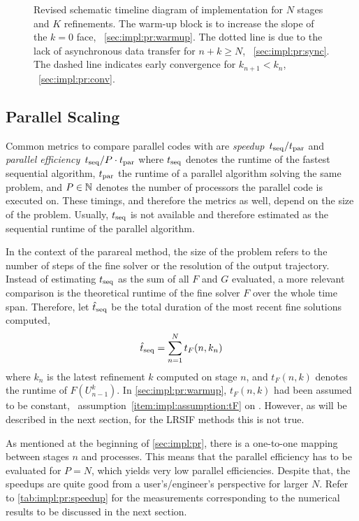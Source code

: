 \begin{figure}[t]
  \centering
  
  \caption[Revised schematic timeline diagram]{%
    Revised schematic timeline diagram of  implementation for $N$ stages and $K$ refinements.
    The warm-up block is to increase the slope of the $k=0$ face,
    \cf~\autoref{sec:impl:pr:warmup}.
    The dotted line is due to the lack of asynchronous data transfer for $n+k \geq N$,
    \cf~\autoref{sec:impl:pr:sync}.
    The dashed line indicates early convergence for $k_{n+1} < k_n$,
    \cf~\autoref{sec:impl:pr:conv}.
  }
  \label{fig:timeline:revised}
\end{figure}

\subsection{Parallel Scaling}

Common metrics to compare parallel codes with are \emph{speedup}~$t_\text{seq}/t_\text{par}$
and \emph{parallel efficiency}~$t_\text{seq}/P\cdot t_\text{par}$
where $t_\text{seq}$ denotes the runtime of the fastest sequential algorithm,
$t_\text{par}$ the runtime of a parallel algorithm solving the same problem,
and $P\in\mathbb{N}$ denotes the number of processors the parallel code is executed on.
These timings, and therefore the metrics as well, depend on the size of the problem.
Usually, $t_\text{seq}$ is not available and therefore estimated as the sequential runtime of the parallel algorithm.

In the context of the parareal method,
the size of the problem refers to the number of steps of the fine solver or the resolution of the output trajectory.
Instead of estimating $t_\text{seq}$ as the sum of all $F$ and $G$ evaluated,
a more relevant comparison is the theoretical runtime of the fine solver $F$ over the whole time span.
Therefore, let $\hat t_\text{seq}$ be the total duration of the most recent fine solutions computed,
\begin{equation}
\label{eq:impl:tseq}
  \hat t_\text{seq} = \sum_{n=1}^N t_F(n, k_n)
\end{equation}
where $k_n$ is the latest refinement $k$ computed on stage $n$,
and $t_F(n,k)$ denotes the runtime of $F(U_{n-1}^k)$.
In \autoref{sec:impl:pr:warmup},
$t_F(n,k)$ had been assumed to be constant,
\cf~assumption~\ref{item:impl:assumption:tF} on .
However, as will be described in the next section,
for the \ac{LRSIF} methods this is not true.

As mentioned at the beginning of \autoref{sec:impl:pr},
there is a one-to-one mapping between stages $n$ and processes.
This means that the parallel efficiency has to be evaluated for $P=N$,
which yields very low parallel efficiencies.
Despite that, the speedups are quite good from a user's/engineer's perspective for larger $N$.
Refer to \autoref{tab:impl:pr:speedup} for the measurements corresponding to the numerical results
to be discussed in the next section.

